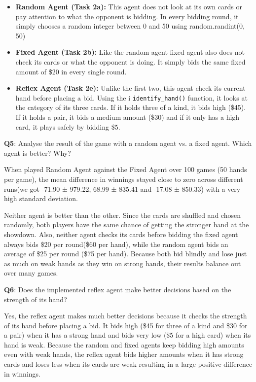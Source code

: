 \documentclass{article}
\begin{document}
 \begin{itemize}
     \item \textbf{Random Agent (Task 2a):} This agent does not look at its own cards or pay attention to what the opponent is bidding. In every bidding round, it simply chooses a random integer between 0 and 50 using random.randint(0, 50)

     \item \textbf{Fixed Agent (Task 2b): } Like the random agent fixed agent also does not check its cards or what the opponent is doing. It simply bids the same fixed amount of \$20 in every single round.


     \item \textbf{Reflex Agent (Task 2e): }Unlike the first two, this agent check its current hand before placing a bid. Using the i \texttt{identify\_hand()} function, it looks at the category of its three cards. If it holds three of a kind, it bids high (\$45). If it holds a pair, it bids a medium amount (\$30) and if it only has a high card, it plays safely by bidding \$5.
\end{itemize}

\begin{tcolorbox}
\textbf{Q5}: Analyse the result of the game with a random agent vs. a fixed agent. Which agent is better? Why?
\end{tcolorbox}
When played Random Agent against the Fixed Agent over 100 games (50 hands per game), the mean difference in winnings stayed close to zero across different runs(we got -71.90 ± 979.22, 68.99 ± 835.41 and -17.08 ± 850.33)  with a very high standard deviation.


\vspace{0.3cm}
Neither agent is better than the other. Since the cards are shuffled and chosen randomly, both players have the same chance of getting the stronger hand at the showdown. Also, neither agent checks its cards before bidding the fixed agent always bids \$20 per round(\$60 per hand), while the random agent bids an average of \$25 per round (\$75 per hand). Because both bid blindly and lose just as much on weak hands as they win on strong hands, their results balance out over many games.


\begin{tcolorbox}
\textbf{Q6}: Does the implemented reflex agent make better decisions based on the strength of its hand?
\end{tcolorbox}
Yes, the reflex agent makes much better decisions because it checks the strength of its hand before placing a bid. It bids high (\$45 for three of a kind and \$30 for a pair) when it has a strong hand and bids very low (\$5 for a high card) when its hand is weak.
Because the random and fixed agents keep bidding high amounts even with weak hands, the reflex agent bids higher amounts when it has strong cards and loses less when its cards are weak resulting in a large positive difference in winnings.
\end{document}

